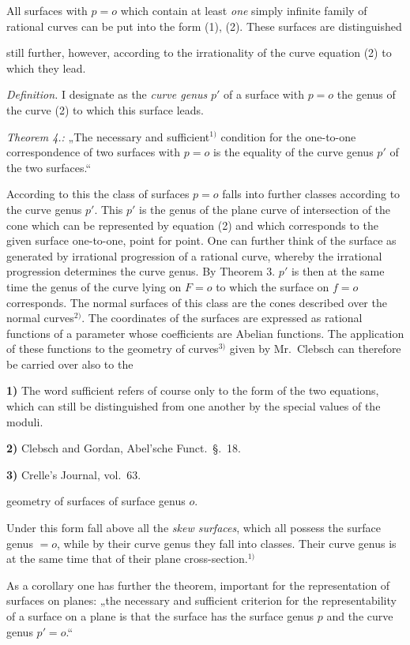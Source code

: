 \documentclass{article}
\begin{document}
All surfaces with $p = o$ which contain at least \emph{one} simply infinite family of rational curves can be put into the form (1), (2). These surfaces are distinguished

still further, however, according to the irrationality of the curve equation (2) to which they lead.

\emph{Definition.} I designate as the \emph{curve genus} $p'$ of a surface with $p = o$ the genus of the curve (2) to which this surface leads.

\emph{Theorem 4.:} „The necessary and sufficient${}^{1)}$ condition for the one-to-one correspondence of two surfaces with $p = o$ is the equality of the curve genus $p'$ of the two surfaces.“

According to this the class of surfaces $p = o$ falls into further classes according to the curve genus $p'$. This $p'$ is the genus of the plane curve of intersection of the cone which can be represented by equation (2) and which corresponds to the given surface one-to-one, point for point. One can further think of the surface as generated by irrational progression of a rational curve, whereby the irrational progression determines the curve genus. By Theorem 3. $p'$ is then at the same time the genus of the curve lying on $F = o$ to which the surface on $f = o$ corresponds. The normal surfaces of this class are the cones described over the normal curves${}^{2)}$. The coordinates of the surfaces are expressed as rational functions of a parameter whose coefficients are Abelian functions. The application of these functions to the geometry of curves${}^{3)}$ given by Mr.\ Clebsch can therefore be carried over also to the

\textbf{1)} The word sufficient refers of course only to the form of the two equations, which can still be distinguished from one another by the special values of the moduli.

\textbf{2)} Clebsch and Gordan, Abel'sche Funct.\ §.\ 18.

\textbf{3)} Crelle's Journal, vol.\ 63.

geometry of surfaces of surface genus $o$.

Under this form fall above all the \emph{skew surfaces}, which all possess the surface genus $= o$, while by their curve genus they fall into classes. Their curve genus is at the same time that of their plane cross-section.${}^{1)}$

As a corollary one has further the theorem, important for the representation of surfaces on planes: „the necessary and sufficient criterion for the representability of a surface on a plane is that the surface has the surface genus $p$ and the curve genus $p' = o$.“
\end{document}
